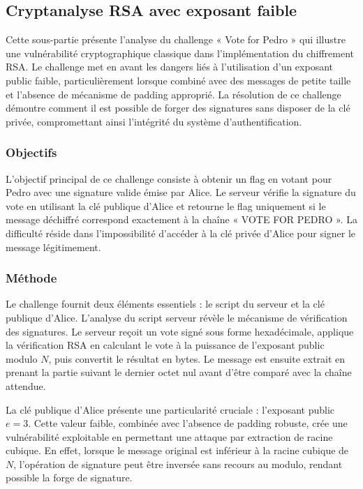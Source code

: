     \subsection{Cryptanalyse RSA avec exposant faible}
    Cette sous-partie présente l'analyse du challenge « Vote for Pedro »
    qui illustre une vulnérabilité cryptographique classique dans
    l'implémentation du chiffrement RSA. Le challenge met en avant les
    dangers liés à l'utilisation d'un exposant public faible, particulièrement
    lorsque combiné avec des messages de petite taille et l'absence de
    mécanisme de padding approprié. La résolution de ce challenge démontre
    comment il est possible de forger des signatures sans disposer de la
    clé privée, compromettant ainsi l'intégrité du système d'authentification.

    \subsubsection{Objectifs}
    L'objectif principal de ce challenge consiste à obtenir un flag en
    votant pour Pedro avec une signature valide émise par Alice. Le
    serveur vérifie la signature du vote en utilisant la clé publique
    d'Alice et retourne le flag uniquement si le message déchiffré
    correspond exactement à la chaîne « VOTE FOR PEDRO ». La difficulté
    réside dans l'impossibilité d'accéder à la clé privée d'Alice pour
    signer le message légitimement.

    \subsubsection{Méthode}
    Le challenge fournit deux éléments essentiels : le script du serveur
    et la clé publique d'Alice. L'analyse du script serveur révèle le
    mécanisme de vérification des signatures. Le serveur reçoit un vote
    signé sous forme hexadécimale, applique la vérification RSA en
    calculant le vote à la puissance de l'exposant public modulo $N$, puis
    convertit le résultat en bytes. Le message est ensuite extrait en
    prenant la partie suivant le dernier octet nul avant d'être comparé
    avec la chaîne attendue.

    La clé publique d'Alice présente une particularité cruciale :
    l'exposant public $e = 3$. Cette valeur faible, combinée avec l'absence
    de padding robuste, crée une vulnérabilité exploitable en permettant
    une attaque par extraction de racine cubique. En effet, lorsque le
    message original est inférieur à la racine cubique de $N$, l'opération
    de signature peut être inversée sans recours au modulo, rendant
    possible la forge de signature.

